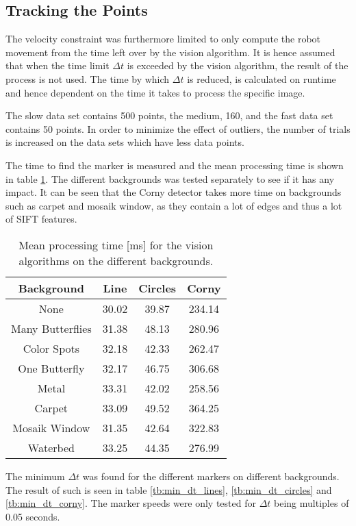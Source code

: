 \subsection{Tracking the Points}
The velocity constraint was furthermore limited to only compute the robot movement from the time left over by the vision algorithm.
It is hence assumed that when the time limit $\Delta t$ is exceeded by the vision algorithm, the result of the process is not used.
The time by which $\Delta t$ is reduced, is calculated on runtime and hence dependent on the time it takes to process the specific image.

The slow data set contains 500 points, the medium, 160, and the fast data set contains 50 points.
In order to minimize the effect of outliers, the number of trials is increased on the data sets which have less data points.

The time to find the marker is measured and the mean processing time is shown in table \ref{tb:mean_processing_time}.
The different backgrounds was tested separately to see if it has any impact.
It can be seen that the Corny detector takes more time on backgrounds such as carpet and mosaik window, as they contain a lot of edges and thus a lot of SIFT features.

\begin{table}[H]
\center
\begin{tabular}{|c|c|c|c|}
\hline
Background       & Line      & Circles   & Corny     \\ \hline
None             & 30.02 & 39.87 & 234.14 \\ \hline
Many Butterflies & 31.38 & 48.13 & 280.96 \\ \hline
Color Spots      & 32.18 & 42.33 & 262.47 \\ \hline
One Butterfly    & 32.17 & 46.75 & 306.68 \\ \hline
Metal            & 33.31 & 42.02 & 258.56 \\ \hline
Carpet           & 33.09 & 49.52 & 364.25 \\ \hline
Mosaik Window    & 31.35 & 42.64 & 322.83 \\ \hline
Waterbed         & 33.25 & 44.35 & 276.99 \\ \hline
\end{tabular}
\caption{Mean processing time [ms] for the vision algorithms on the different backgrounds.}
\label{tb:mean_processing_time}
\end{table}

The minimum $\Delta t$ was found for the different markers on different backgrounds.
The result of such is seen in table \ref{tb:min_dt_lines}, \ref{tb:min_dt_circles}
 and \ref{tb:min_dt_corny}.
The marker speeds were only tested for $\Delta t$ being multiples of 0.05 seconds.

